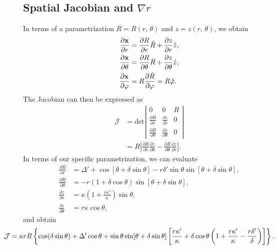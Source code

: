 \documentclass[11pt,a4paper]{article}
\renewcommand{\b}[1]{\ensuremath{ {\bf #1 } }}
\begin{document}
\subsection{Spatial Jacobian and $\nabla r$}
In terms of a parametrization $R=R(r,\,\theta)$ and $z = z(r,\,\theta)$, we obtain
\begin{align}
\frac{\partial \b{x}}{\partial r} &= \frac{\partial R}{\partial r}\hat{R} + \frac{\partial z}{\partial r}\hat{z} , \nonumber \\
\frac{\partial \b{x}}{\partial \theta} &= \frac{\partial R}{\partial \theta}\hat{R} + \frac{\partial z}{\partial \theta}\hat{z} , \nonumber \\
\frac{\partial \b{x}}{\partial \varphi} &= R\frac{\partial \hat{R}}{\partial \varphi} = R\hat{\varphi}.
\end{align}
The Jacobian can then be expressed as
\begin{align}
\mathcal{J} &= \text{det}\left|\begin{matrix}
0 & 0 & R \\
\frac{\partial R}{\partial r} & \frac{\partial z}{\partial r} & 0 \\
\frac{\partial R}{\partial \theta} & \frac{\partial z}{\partial \theta} & 0 
\end{matrix}\right| \nonumber \\
&= R\left| \frac{\partial R}{\partial r}\frac{\partial z}{\partial \theta} - \frac{\partial R}{\partial \theta}\frac{\partial z}{\partial r}\right|.
\end{align}
In terms of our specific parametrization, we can evaluate
\begin{align}
\frac{\partial R}{\partial r} &= \Delta' + \cos[\theta+\delta\sin\theta]-r\delta'\sin\theta\sin[\theta+\delta\sin\theta], \nonumber \\
\frac{\partial R}{\partial \theta} &= -r(1+\delta\cos\theta)\sin[\theta+\delta\sin\theta],  \nonumber \\
\frac{\partial z}{\partial r} &=  \kappa\left(1+ \frac{r\kappa'}{\kappa}\right)\sin\theta, \nonumber \\
\frac{\partial z}{\partial \theta} &= r\kappa\cos\theta,
\end{align}
and obtain
\begin{align}
\hspace{-10mm} \mathcal{J} %
= \kappa r R \left\{ \cos(\delta\sin\theta) + \Delta'\cos\theta + \sin\theta\sin[\theta+\delta\sin\theta]\left[\frac{r\kappa'}{\kappa} + \delta\cos\theta\left(1+\frac{r\kappa'}{\kappa}-\frac{r\delta'}{\delta} \right) \right] \right\}.
\end{align}
\end{document}
